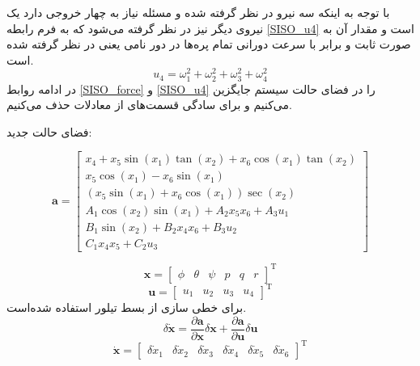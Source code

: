 با توجه به اینکه سه نیرو در نظر گرفته ‌شده و مسئله نیاز به چهار خروجی دارد یک نیروی دیگر نیز در نظر گرفته ‌می‌شود که به فرم رابطه 
\ref{SISO_u4}
است و مقدار آن به صورت ثابت و برابر با سرعت دورانی تمام پره‌ها در دور نامی یعنی
در نظر گرفته ‌شده ‌است.
\begin{equation}\label{SISO_u4}
	u_4 = \omega_1^2 + \omega_2^2  + \omega_3^2 + \omega_4^2
\end{equation}
در ادامه روابط 
\ref{SISO_force}
و
\ref{SISO_u4}
را در فضای حالت سیستم جایگزین می‌کنیم و برای سادگی قسمت‌های 
از معادلات حذف می‌کنیم.

فضای حالت جدید:

\begin{equation}
	\boldsymbol a = \begin{bmatrix}
		x_4 + x_5\sin(x_1)\tan(x_2) + x_6\cos(x_1)\tan(x_2)\\
		x_5\cos(x_1)- x_6\sin(x_1)\\
		(x_5\sin(x_1) + x_6\cos(x_1))\sec(x_2)\\
		A_1\cos(x_2)\sin(x_1) + 
		A_2x_5x_6 + A_3u_1
		\\
		B_1\sin(x_2) + 
		B_2x_4x_6 + B_3u_2\\
		C_1x_4x_5 + 
		C_2u_3
	\end{bmatrix}
\end{equation} 

\begin{equation}
	\boldsymbol{x} = \begin{bmatrix}
		\phi& \theta & \psi & p& q& r
	\end{bmatrix}^\mathrm{T}
\end{equation}
\begin{equation}
	\boldsymbol{u} = \begin{bmatrix}
		u_1&u_2&u_3&u_4
	\end{bmatrix}^\mathrm{T}
\end{equation}
برای خطی سازی از بسط تیلور استفاده شده‌است.
\begin{equation}
	\delta \dot{\boldsymbol{x}} = \dfrac{\partial \boldsymbol a}{\partial \boldsymbol x}\delta \boldsymbol x + \dfrac{\partial \boldsymbol a}{\partial \boldsymbol u}\delta \boldsymbol u 
\end{equation}
\begin{equation}
	\dot{\boldsymbol{x}} =
	\begin{bmatrix}
		\delta \dot x_1&
		\delta \dot x_2&
		\delta \dot x_3&
		\delta \dot x_4&
		\delta \dot x_5&
		\delta \dot x_6
	\end{bmatrix}^\mathrm{T}
\end{equation}

